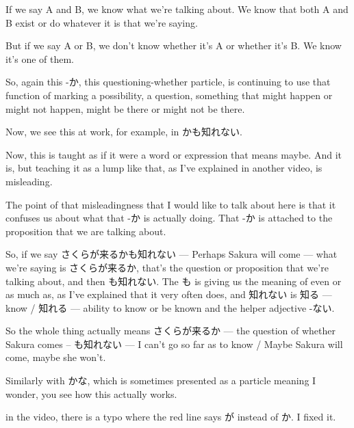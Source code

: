 If we say A and B, we know what we're talking about. We know that both A and B exist or do whatever it is that we're saying.

But if we say A or B, we don't know whether it's A or whether it's B. We know it's one of them.

So, again this -か, this questioning-whether particle, is continuing to use that function of marking a possibility, a question, something that might happen or might not happen, might be there or might not be there.

\stopsectionlevel

\startsectionlevel[title={かも知れない},reference={かも知れない}]

Now, we see this at work, for example, in かも知れない.

{}

Now, this is taught as if it were a word or expression that means maybe. And it is, but teaching it as a lump like that, as I've explained in another video, is misleading.

The point of that misleadingness that I would like to talk about here is that it confuses us about what that -か is actually doing. That -か is attached to the proposition that we are talking about.

So, if we say さくらが来るかも知れない --- Perhaps Sakura will come --- what we're saying is さくらが来るか, that's the question or proposition that we're talking about, and then も知れない. The も is giving us the meaning of even or as much as, as I've explained that it very often does, and 知れない is 知る --- know / 知れる --- ability to know or be known and the helper adjective -ない.

So the whole thing actually means さくらが来るか --- the question of whether Sakura comes -- も知れない --- I can't go so far as to know / Maybe Sakura will come, maybe she won't.

\stopsectionlevel

\startsectionlevel[title={かな},reference={かな}]

Similarly with かな, which is sometimes presented as a particle meaning I wonder, you see how this actually works.

{}

in the video, there is a typo where the red line says が instead of か. I fixed it.

{}

